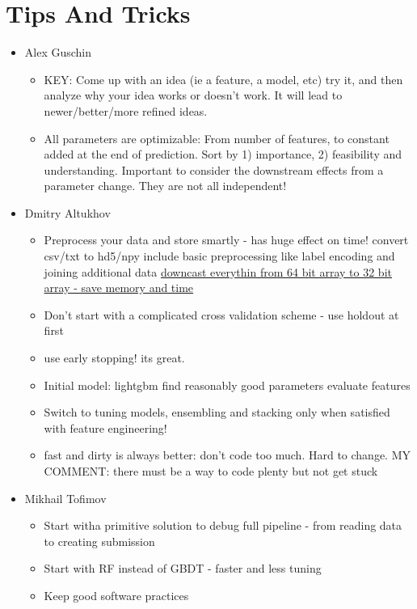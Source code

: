 \documentclass[a4paper]{report}
\begin{document}
\section{Tips And Tricks}
\begin{itemize}
  \item Alex Guschin
    \begin{itemize}
      \item KEY: Come up with an idea (ie a feature, a model, etc) try it, and then analyze why your idea works or doesn't work. It will lead to newer/better/more refined ideas.
      \item All parameters are optimizable: From number of features, to constant added at the end of prediction. Sort by 1) importance, 2) feasibility and understanding.
      \subitem Important to consider the downstream effects from a parameter change. They are not all independent! 
  \end{itemize}
\item Dmitry Altukhov
  \begin{itemize}
    \item Preprocess your data and store smartly - has huge effect on time!
      \subitem convert csv/txt to hd5/npy
      \subitem include basic preprocessing like label encoding and joining additional data
      \subitem \underline{ downcast everythin from 64 bit array to 32 bit array  - save memory and time}
    \item Don't start with a complicated cross validation scheme - use holdout at first
    \item use early stopping! its great.
    \item Initial model: lightgbm
      \subitem find reasonably good parameters
      \subitem evaluate features
    \item Switch to tuning models, ensembling and stacking only when satisfied with feature engineering!
    \item fast and dirty is always better: don't code too much. Hard to change.
      \subitem MY COMMENT: {there must be a way to code plenty but not get stuck}
  \end{itemize}
\item Mikhail Tofimov
  \begin{itemize}
    \item Start witha primitive solution to debug full pipeline - from reading data to creating submission
    \item Start with RF instead of GBDT - faster and less tuning
    \item Keep good software practices

\end{itemize}
\end{itemize}
\end{document}
